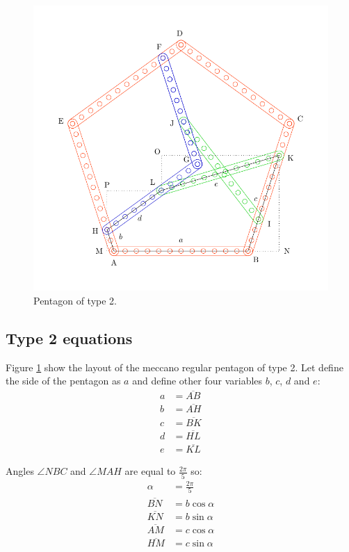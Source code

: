 \documentclass[11pt]{article}
\begin{document}
\begin{figure}[htpb]
\centering
\includegraphics[scale=0.75]{types/2}
\caption{Pentagon of type 2.}
\label{fig:type-2}
\end{figure}

\subsection{Type 2 equations}

Figure \ref{fig:type-2} show the layout of the meccano regular pentagon of type 2.
Let define the side of the pentagon as $a$ and define other four variables $b$, $c$, $d$ and $e$:
\begin{align*}
a &= \overline{AB}\\
b &= \overline{AH}\\
c &= \overline{BK}\\
d &= \overline{HL}\\
e &= \overline{KL}
\end{align*}

Angles $\angle{NBC}$ and $\angle{MAH}$ are equal to $\frac{2\pi}{5}$ so:
\begin{align*}
\alpha &= \frac{2\pi}{5}\\
\overline{BN} &= b\cos{\alpha}\\
\overline{KN} &= b\sin{\alpha}\\
\overline{AM} &= c\cos{\alpha}\\
\overline{HM} &= c\sin{\alpha}
\end{align*}
\end{document}
